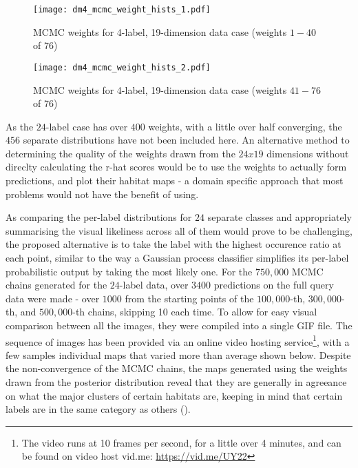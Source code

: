 
\begin{figure}[H]
    \centerline{\texttt{[image: dm4\_mcmc\_weight\_hists\_1.pdf]}}
    \caption{MCMC weights for 4-label, 19-dimension data case (weights $1-40$ of $76$)}
    \label{fig:4l-mcmc_weights-1}
\end{figure}


\begin{figure}[H]
    \centerline{\texttt{[image: dm4\_mcmc\_weight\_hists\_2.pdf]}}
    \caption{MCMC weights for 4-label, 19-dimension data case (weights $41-76$ of $76$)}
    \label{fig:4l-mcmc_weights-2}
\end{figure}

As the $24$-label case has over $400$ weights, with a little over half converging, the $456$ separate distributions have not been included here. An alternative method to determining the quality of the weights drawn from the $24x19$ dimensions without direclty calculating the r-hat scores would be to use the weights to actually form predictions, and plot their habitat maps - a domain specific approach that most problems would not have the benefit of using. 

As comparing the per-label distributions for $24$ separate classes and appropriately summarising the visual likeliness across all of them would prove to be challenging, the proposed alternative is to take the label with the highest occurence ratio at each point, similar to the way a Gaussian process classifier simplifies its per-label probabilistic output by taking the most likely one. For the $750,000$ MCMC chains generated for the $24$-label data, over $3400$ predictions on the full query data were made - over $1000$ from the starting points of the $100,000$-th, $300,000$-th, and $500,000$-th chains, skipping 10 each time. To allow for easy visual comparison between all the images, they were compiled into a single GIF file. The sequence of images has been provided via an online video hosting service\footnote{The video runs at 10 frames per second, for a little over 4 minutes, and can be found on video host vid.me: \url{https://vid.me/UY22}}, with a few samples individual maps that varied more than average shown below. Despite the non-convergence of the MCMC chains, the maps generated using the weights drawn from the posterior distribution reveal that they are generally in agreeance on what the major clusters of certain habitats are, keeping in mind that certain labels are in the same category as others ().

